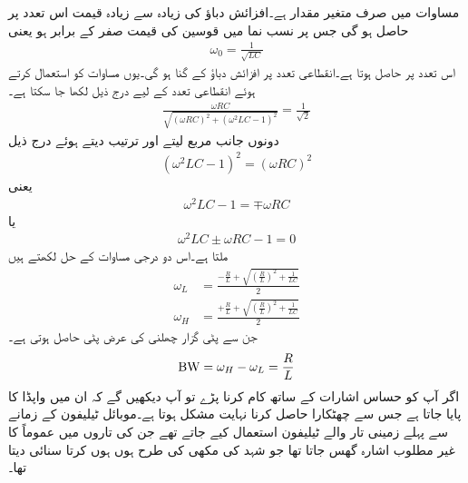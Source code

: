 مساوات  میں صرف  متغیر مقدار ہے۔افزائش دباؤ کی زیادہ سے زیادہ قیمت  اس تعدد  پر حاصل ہو گی جس پر نسب نما میں قوسین کی قیمت صفر کے برابر ہو یعنی
\begin{align}
\omega_0=\frac{1}{\sqrt{LC}}
\end{align} 
اس تعدد پر  حاصل ہوتا ہے۔انقطاعی تعدد پر افزائش دباؤ  کے  گنا ہو گی۔یوں مساوات  کو استعمال کرتے ہوئے انقطاعی تعدد کے لیے درج ذیل لکھا جا سکتا ہے۔
\begin{align*}
\frac{\omega RC}{\sqrt{(\omega RC)^2+(\omega^2 LC-1)^2}}=\frac{1}{\sqrt{2}}
\end{align*}
دونوں جانب مربع لیتے اور ترتیب دیتے ہوئے درج ذیل
\begin{align*}
(\omega^2 LC-1)^2=(\omega RC)^2
\end{align*}
یعنی
\begin{align*}
\omega^2 LC-1=\mp \omega RC
\end{align*}
یا
\begin{align*}
\omega^2 LC\pm \omega RC-1=0
\end{align*}
ملتا ہے۔اس دو درجی مساوات کے حل لکھتے ہیں
\begin{align}
\omega_L&=\frac{-\frac{R}{L}+\sqrt{\left(\frac{R}{L}\right)^2+\frac{1}{LC}}}{2}\\
\omega_H&=\frac{+\frac{R}{L}+\sqrt{\left(\frac{R}{L}\right)^2+\frac{1}{LC}}}{2}
\end{align}
جن سے پٹی گزار چھلنی کی عرض پٹی  حاصل ہوتی ہے۔
\begin{align}
{\ensuremath{{\textup{BW}}}}=\omega_H-\omega_L=\frac{R}{L}
\end{align}
اگر آپ کو حساس اشارات کے ساتھ کام کرنا پڑے تو آپ دیکھیں گے کہ ان میں واپڈا کا  پایا جاتا ہے جس سے چھٹکارا حاصل کرنا نہایت مشکل ہوتا ہے۔موبائل ٹیلیفون کے زمانے سے پہلے زمینی تار والے ٹیلیفون استعمال کیے جاتے تھے جن کی تاروں میں عموماً  کا غیر مطلوب اشارہ گھس جاتا تھا جو شہد کی مکھی کی طرح ہوں ہوں کرتا سنائی دیتا تھا۔

